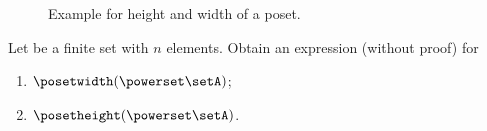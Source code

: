 {\begin{figure}[h]
    \caption{Example for height and width of a poset.
    }
\end{figure}

\vfill
\begin{gradedexercise}
    \label{ex:MeasurePowerPoset}

    Let \setA be a finite set with $n$ elements.
    Obtain an expression (without proof) for
    \begin{enumerate}
        \item $\posetwidth(\powerset \setA)$;
        \item $\posetheight(\powerset \setA)$.
    \end{enumerate}
\end{gradedexercise}


}
